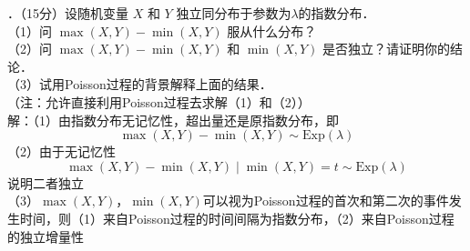 \documentclass[UTF8,openany]{book}
\begin{document}
．（15分）设随机变量 $X$ 和 $Y$ 独立同分布于参数为$\lambda$的指数分布．\\
（1）问 $\max (X, Y)-\min (X, Y)$ 服从什么分布？\\
（2）问 $\max (X, Y)-\min (X, Y)$ 和 $\min (X, Y)$ 是否独立？请证明你的结论．\\
（3）试用Poisson过程的背景解释上面的结果．\\
（注：允许直接利用Poisson过程去求解（1）和（2））\\
解：（1）由指数分布无记忆性，超出量还是原指数分布，即
\[
\max (X, Y)-\min (X, Y)\sim \mathrm{Exp}(\lambda)
\]
（2）由于无记忆性
\[
\max (X, Y)-\min (X, Y) \mid \min (X, Y)=t \sim \mathrm{Exp}(\lambda)
\]
说明二者独立\\
（3）$\max (X, Y)$，$\min (X, Y)$可以视为Poisson过程的首次和第二次的事件发生时间，则（1）来自Poisson过程的时间间隔为指数分布，（2）来自Poisson过程的独立增量性\\
\end{document}
